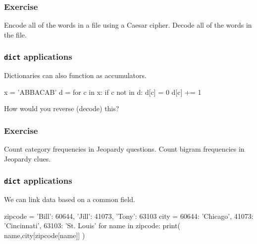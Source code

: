 \documentclass[11pt]{beamer}
\begin{document}
\begin{frame}[fragile]
  \frametitle{Exercise}
  \Enlarge

  \begin{itemize}
  \myitem  Encode all of the words in a file using a Caesar cipher.
  \myitem  Decode all of the words in the file.
  \end{itemize}
\end{frame}

\begin{frame}[fragile]
  \frametitle{\texttt{dict} applications}
  \Enlarge

  \begin{itemize}
  \myitem  Dictionaries can also function as accumulators.
  \end{itemize}
  \begin{semiverbatim}
x = 'ABBACAB'
d = {}
for c in x:
    if c not in d:
        d[c] = 0
        d[c] += 1
  \end{semiverbatim}
  \begin{itemize}
  \myitem  How would you reverse (decode) this?
  \end{itemize}
\end{frame}

\begin{frame}[fragile]
  \frametitle{Exercise}
  \Enlarge

  \begin{itemize}
  \myitem  Count category frequencies in Jeopardy questions.
  \myitem  Count bigram frequencies in Jeopardy clues.
  \end{itemize}
\end{frame}

\begin{frame}[fragile]
  \frametitle{\texttt{dict} applications}
  \Enlarge

  \begin{itemize}
  \myitem  We can link data based on a common field.
  \end{itemize}
  \begin{semiverbatim}
zipcode = { 'Bill': 60644,
            'Jill': 41073,
            'Tony': 63103 }
city = { 60644: 'Chicago',
         41073: 'Cincinnati',
         63103: 'St. Louis' }
for name in zipcode:
    print( name,city[zipcode[name]] )
  \end{semiverbatim}
\end{frame}
\end{document}
